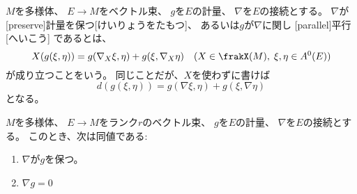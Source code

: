 \documentclass[report]{jlreq}
\begin{document}
\begin{definition}[計量を保つ接続]
    $M$を多様体、
    $E \to M$をベクトル束、
    $g$を$E$の計量、
    $\nabla$を$E$の接続とする。
    $\nabla$が[preserve]{計量を保つ}[けいりょうをたもつ]、
    あるいは$g$が$\nabla$に関し
    [parallel]{平行}[へいこう]
    であるとは、
    \begin{equation}
        X(g(\xi, \eta)) = g(\nabla_X\xi, \eta) + g(\xi, \nabla_X\eta)
        \quad (X \in \frakX(M), \; \xi, \eta \in A^0(E))
    \end{equation}
    が成り立つことをいう。
    同じことだが、$X$を使わずに書けば
    \begin{equation}
        d(g(\xi, \eta)) = g(\nabla\xi, \eta) + g(\xi, \nabla\eta)
    \end{equation}
    となる。
\end{definition}

\begin{proposition}[計量を保つ接続の特徴付け]
    $M$を多様体、
    $E \to M$をランク$r$のベクトル束、
    $g$を$E$の計量、
    $\nabla$を$E$の接続とする。
    このとき、次は同値である:
    \begin{enumerate}
        \item $\nabla$が$g$を保つ。
        \item $\nabla g = 0$
    \end{enumerate}
\end{proposition}
\end{document}
